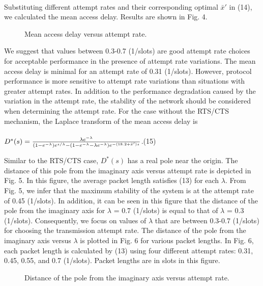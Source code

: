 \documentclass[10pt,twocolumn,oneside,submit]{JCNtran}
\begin{document}
\\
Substituting different attempt rates and their corresponding optimal $\bar x'$ in (14), we calculated the mean access delay. Results are shown in Fig. 4.
\begin{figure}[t]
\begin{center}
\epsfxsize=8cm \leavevmode{} \caption{Mean access delay versus attempt rate.} \label{fig:4}
\end{center}
\end{figure}
We suggest that values between 0.3-0.7 (1/slots) are good attempt rate choices for acceptable performance in the presence of attempt rate variations. The mean access delay is minimal for an attempt rate of 0.31 (1/slots). However, protocol performance is more sensitive to attempt rate variations than situations with greater attempt rates.
In addition to the performance degradation caused by the variation in the attempt rate, the stability of the network should be considered when determining the attempt rate. For the case without the RTS/CTS mechanism, the Laplace transform of the mean access delay is\\
\\
$D^*(s)={\lambda e^{-\lambda }\over(1-e^{-\lambda })e^{s/\lambda }-(1-e^{-\lambda }-\lambda e^{-\lambda })e^{-(18.2+\bar x')s}}$.\hfill(15) \\
\par Similar to the RTS/CTS case, $D^*(s)$ has a real pole near the origin. The distance of this pole from the imaginary axis versus attempt rate is depicted in Fig. 5. In this figure, the average packet length satisfies (13) for each $\lambda $. From Fig. 5, we infer that the maximum stability of the system is at the attempt rate of 0.45 (1/slots). In addition, it can be seen in this figure that the distance of the pole from the imaginary axis for $\lambda $ = 0.7 (1/slots) is equal to that of $\lambda $ = 0.3 (1/slots). Consequently, we focus on values of $\lambda $ that are between 0.3-0.7 (1/slots) for choosing the transmission attempt rate. The distance of the pole from the imaginary axis versus $\lambda $ is plotted in Fig. 6 for various packet lengths. In Fig. 6, each packet length is calculated by (13) using four different attempt rates: 0.31, 0.45, 0.55, and 0.7 (1/slots). Packet lengths are in slots in this figure.
\begin{figure}[h!tb]
\begin{center}
\epsfxsize=8cm \leavevmode{} \caption{Distance of the pole from the imaginary axis versus attempt rate.} \label{fig:5}
\end{center}
\end{figure}
\end{document}
